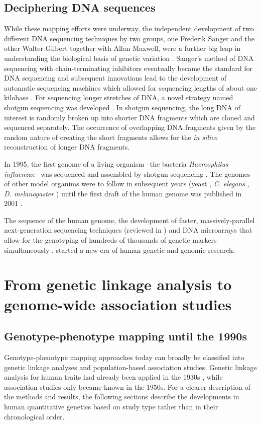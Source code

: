 \subsection{Deciphering DNA sequences}
While these mapping efforts were underway, the independent development of two different DNA sequencing techniques by two groups, one Frederik Sanger and the other Walter Gilbert together with Allan Maxwell, were a further big leap in understanding the biological basis of genetic variation \citep{Sanger1977,Maxam1977}. Sanger's method of DNA sequencing with chain-terminating inhibitors eventually became the standard for DNA sequencing and subsequent innovations lead to the development of automatic sequencing machines which allowed for sequencing lengths of about one kilobase \citep{Hunkapiller1991}. For sequencing longer stretches of DNA, a novel strategy named shotgun sequencing was developed \citep{Staden1979,Anderson1981}. In shotgun sequencing, the long DNA of interest is randomly broken up into shorter DNA fragments which are cloned and sequenced separately. The occurrence of overlapping DNA fragments given by the random nature of creating the short fragments allows for the \textit{in silico} reconstruction of longer DNA fragments.

In 1995, the first genome of a living organism --the bacteria \textit{Haemophilus influenzae}-- was sequenced and assembled by shotgun sequencing \citep{Fleischmann1995}. The genomes of other model organims were to follow in subsequent years (yeast \citep{Goffeau1996}, \textit{C. elegans} \citep{C.elegans1998}, \textit{D. melanogaster} \citep{Adams2000}) until the first draft of the human genome was published in  2001 \citep{Lander2001}. 

The sequence of the human genome, the development of faster, massively-parallel next-generation sequencing techniques (reviewed in \citep{Shendure2008,Heather2016}) and DNA microarrays that allow for the genotyping of hundreds of thousands of genetic markers simultaneously \citep{Wang1998}, started a new era of human genetic and genomic research. 

\section{From genetic linkage analysis to genome-wide association studies}
\subsection{Genotype-phenotype mapping until the 1990s}
Genotype-phenotype mapping approaches today can broadly be classified into genetic linkage analyses and population-based association studies. Genetic linkage analysis for human traits had already been applied in the 1930s \citep{Bernstein1930,Penrose1935}, while association studies only became known in the 1950s. For a clearer description of the methods and results, the following sections describe the developments in human quantitative genetics based on study type rather than in their chronological order. 

